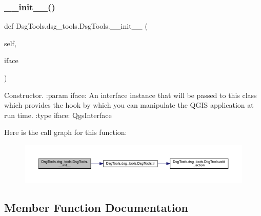 \subsubsection{\texorpdfstring{\+\_\+\+\_\+init\+\_\+\+\_\+()}{\_\_init\_\_()}}
{\footnotesize\ttfamily def Dsg\+Tools.\+dsg\+\_\+tools.\+Dsg\+Tools.\+\_\+\+\_\+init\+\_\+\+\_\+ (\begin{DoxyParamCaption}\item[{}]{self,  }\item[{}]{iface }\end{DoxyParamCaption})}

\begin{DoxyVerb}Constructor.
:param iface: An interface instance that will be passed to this class
    which provides the hook by which you can manipulate the QGIS
    application at run time.
:type iface: QgsInterface
\end{DoxyVerb}
 Here is the call graph for this function\+:
\nopagebreak
\begin{figure}[H]
\begin{center}
\leavevmode
\includegraphics[width=350pt]{class_dsg_tools_1_1dsg__tools_1_1_dsg_tools_af233064bb2aff6407b3824c4be61ef37_cgraph}
\end{center}
\end{figure}


\subsection{Member Function Documentation}
\mbox{\label{class_dsg_tools_1_1dsg__tools_1_1_dsg_tools_a15c3df2c1c8baf94cd08d32ca310e557}} 
